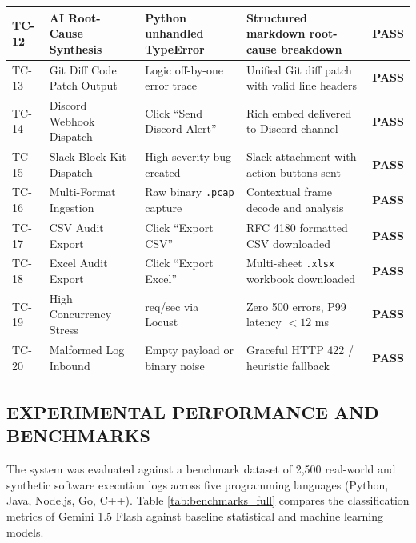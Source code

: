 \documentclass[12pt,a4paper]{article}
\begin{document}
\begin{table}[H]
\begin{tabularx}{\textwidth}{|>{\centering\arraybackslash}p{1.2cm}|>{\raggedright\arraybackslash}p{3.2cm}|>{\raggedright\arraybackslash}p{3.5cm}|>{\raggedright\arraybackslash}X|>{\centering\arraybackslash}p{1.2cm}|}
\hline
TC-12 & AI Root-Cause Synthesis & Python unhandled TypeError & Structured markdown root-cause breakdown & \textbf{PASS} \\
\hline
TC-13 & Git Diff Code Patch Output & Logic off-by-one error trace & Unified Git diff patch with valid line headers & \textbf{PASS} \\
\hline
TC-14 & Discord Webhook Dispatch & Click ``Send Discord Alert'' & Rich embed delivered to Discord channel & \textbf{PASS} \\
\hline
TC-15 & Slack Block Kit Dispatch & High-severity bug created & Slack attachment with action buttons sent & \textbf{PASS} \\
\hline
TC-16 & Multi-Format Ingestion & Raw binary \texttt{.pcap} capture & Contextual frame decode and analysis & \textbf{PASS} \\
\hline
TC-17 & CSV Audit Export & Click ``Export CSV'' & RFC 4180 formatted CSV downloaded & \textbf{PASS} \\
\hline
TC-18 & Excel Audit Export & Click ``Export Excel'' & Multi-sheet \texttt{.xlsx} workbook downloaded & \textbf{PASS} \\
\hline
TC-19 & High Concurrency Stress & 800 req/sec via Locust & Zero 500 errors, P99 latency $< 12$ ms & \textbf{PASS} \\
\hline
TC-20 & Malformed Log Inbound & Empty payload or binary noise & Graceful HTTP 422 / heuristic fallback & \textbf{PASS} \\
\hline
\end{tabularx}
\end{table}

\clearpage
\subsection{EXPERIMENTAL PERFORMANCE AND BENCHMARKS}
The system was evaluated against a benchmark dataset of 2,500 real-world and synthetic software execution logs across five programming languages (Python, Java, Node.js, Go, C++). Table \ref{tab:benchmarks_full} compares the classification metrics of Gemini 1.5 Flash against baseline statistical and machine learning models.
\end{document}
